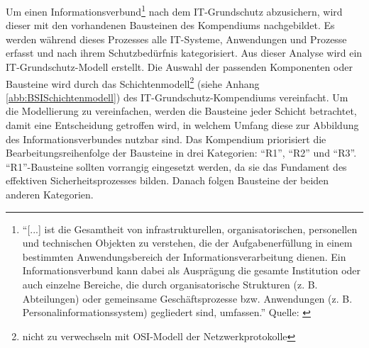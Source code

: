 Um einen Informationsverbund\footnote{\enquote{[...] ist die Gesamtheit von infrastrukturellen, organisatorischen, personellen und technischen Objekten zu verstehen, die der Aufgabenerfüllung in einem bestimmten Anwendungsbereich der Informationsverarbeitung dienen. Ein Informationsverbund kann dabei als Ausprägung die gesamte Institution oder	auch einzelne Bereiche, die durch organisatorische Strukturen (z. B. Abteilungen) oder gemeinsame Geschäftsprozesse bzw. Anwendungen (z. B. Personalinformationssystem) gegliedert sind, umfassen.} Quelle: \cite[][S.\,37]{bundesamt_fur_sicherheit_in_der_informationstechnik_bsi_it-grundschutz-kompendium_2020}} nach dem IT-Grundschutz abzusichern, wird dieser mit den vorhandenen Bausteinen des Kompendiums nachgebildet. Es werden während dieses Prozesses alle IT-Systeme, Anwendungen und Prozesse erfasst und nach ihrem Schutzbedürfnis kategorisiert. Aus dieser Analyse wird ein IT-Grundschutz-Modell erstellt. Die Auswahl der passenden Komponenten oder Bausteine wird durch das Schichtenmodell\footnote{nicht zu verwechseln mit \ac{OSI}-Modell der Netzwerkprotokolle} (siehe Anhang \vref{abb:BSISchichtenmodell}) des IT-Grundschutz-Kompendiums vereinfacht. Um die Modellierung zu vereinfachen, werden die Bausteine jeder Schicht betrachtet, damit eine Entscheidung getroffen wird, in welchem Umfang diese zur Abbildung des Informationsverbundes nutzbar sind. Das Kompendium priorisiert die Bearbeitungsreihenfolge der Bausteine in drei Kategorien: \enquote{R1}, \enquote{R2} und \enquote{R3}. \enquote{R1}-Bausteine sollten vorrangig eingesetzt werden, da sie das Fundament des effektiven Sicherheitsprozesses bilden. Danach folgen Bausteine der beiden anderen Kategorien.

